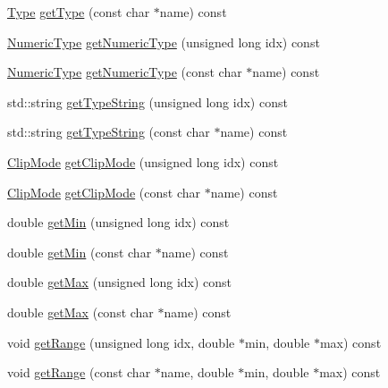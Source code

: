 \begin{DoxyCompactItemize}
\item 
\hyperlink{class_frame_lib___parameters_a01bd45aaa25fa8cfaec369e2c8a8371a}{Type} \hyperlink{class_frame_lib___parameters_a705bba592b790d1b884b2ea4dd4bdbd4}{get\+Type} (const char $\ast$name) const
\item 
\hyperlink{class_frame_lib___parameters_a61fa243341eccefa66dbb744b7e047a0}{Numeric\+Type} \hyperlink{class_frame_lib___parameters_a57052803e8a3ab34c40bf4dedd33e196}{get\+Numeric\+Type} (unsigned long idx) const
\item 
\hyperlink{class_frame_lib___parameters_a61fa243341eccefa66dbb744b7e047a0}{Numeric\+Type} \hyperlink{class_frame_lib___parameters_a7d9b774329a6e87643a6714913687cfe}{get\+Numeric\+Type} (const char $\ast$name) const
\item 
std\+::string \hyperlink{class_frame_lib___parameters_a75457679ab4b67d5d438bf8619544d94}{get\+Type\+String} (unsigned long idx) const
\item 
std\+::string \hyperlink{class_frame_lib___parameters_a7531a5e8e9ea19a84dd8314ed2ebe4f3}{get\+Type\+String} (const char $\ast$name) const
\item 
\hyperlink{class_frame_lib___parameters_afcefd8a6a664599b93f635538d95265a}{Clip\+Mode} \hyperlink{class_frame_lib___parameters_ac574f7fd7e17b4d5df393c84b81b4431}{get\+Clip\+Mode} (unsigned long idx) const
\item 
\hyperlink{class_frame_lib___parameters_afcefd8a6a664599b93f635538d95265a}{Clip\+Mode} \hyperlink{class_frame_lib___parameters_ab54fc0edf6fed7029dec5dd09f884b38}{get\+Clip\+Mode} (const char $\ast$name) const
\item 
double \hyperlink{class_frame_lib___parameters_af73a52dd8beadde0c65159fd2d8d35ce}{get\+Min} (unsigned long idx) const
\item 
double \hyperlink{class_frame_lib___parameters_ac188e94ada437c42fceac7f1c502c536}{get\+Min} (const char $\ast$name) const
\item 
double \hyperlink{class_frame_lib___parameters_a6d18778368a98852e2d710748ecea5fb}{get\+Max} (unsigned long idx) const
\item 
double \hyperlink{class_frame_lib___parameters_a9b1b814d8df6fed63adb0854383df279}{get\+Max} (const char $\ast$name) const
\item 
void \hyperlink{class_frame_lib___parameters_a9addab9977edd69cc6cfa7b5f4a70a9d}{get\+Range} (unsigned long idx, double $\ast$min, double $\ast$max) const
\item 
void \hyperlink{class_frame_lib___parameters_a3287eb6847370554758129162e5eff11}{get\+Range} (const char $\ast$name, double $\ast$min, double $\ast$max) const

\end{DoxyCompactItemize}
